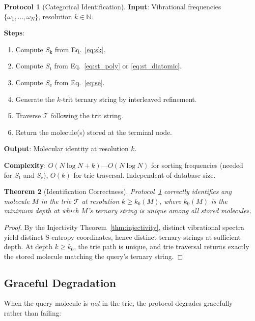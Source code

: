 \documentclass[11pt,twocolumn,a4paper]{article}
\newtheorem{theorem}{Theorem}[section]
\theoremstyle{definition}
\newtheorem{protocol}[theorem]{Protocol}
\theoremstyle{remark}
\newcommand{\Sk}{S_{\mathrm{k}}}
\newcommand{\St}{S_{\mathrm{t}}}
\newcommand{\Se}{S_{\mathrm{e}}}
\newcommand{\Natural}{\mathbb{N}}
\newcommand{\Trie}{\mathcal{T}}
\begin{document}
\begin{protocol}[Categorical Identification]
\label{prot:identification}
\textbf{Input}: Vibrational frequencies $\{\omega_1, \ldots, \omega_N\}$, resolution $k \in \Natural$.

\textbf{Steps}:
\begin{enumerate}[nosep]
\item Compute $\Sk$ from Eq.~\eqref{eq:sk}.
\item Compute $\St$ from Eq.~\eqref{eq:st_poly} or \eqref{eq:st_diatomic}.
\item Compute $\Se$ from Eq.~\eqref{eq:se}.
\item Generate the $k$-trit ternary string by interleaved refinement.
\item Traverse $\Trie$ following the trit string.
\item Return the molecule(s) stored at the terminal node.
\end{enumerate}

\textbf{Output}: Molecular identity at resolution $k$.

\textbf{Complexity}: $O(N \log N + k)$---$O(N \log N)$ for sorting frequencies (needed for $\St$ and $\Se$), $O(k)$ for trie traversal. Independent of database size.
\end{protocol}

\begin{theorem}[Identification Correctness]
\label{thm:id_correct}
Protocol~\ref{prot:identification} correctly identifies any molecule $M$ in the trie $\Trie$ at resolution $k \geq k_0(M)$, where $k_0(M)$ is the minimum depth at which $M$'s ternary string is unique among all stored molecules.
\end{theorem}

\begin{proof}
By the Injectivity Theorem~\ref{thm:injectivity}, distinct vibrational spectra yield distinct S-entropy coordinates, hence distinct ternary strings at sufficient depth. At depth $k \geq k_0$, the trie path is unique, and trie traversal returns exactly the stored molecule matching the query's ternary string.
\end{proof}

\subsection{Graceful Degradation}

When the query molecule is \emph{not} in the trie, the protocol degrades gracefully rather than failing:
\end{document}
